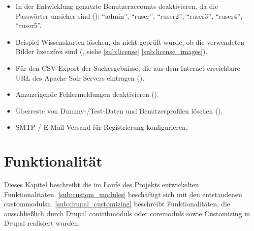 \begin{itemize}
	\item In der Entwicklung genutzte Benutzeraccounts deaktivieren, da die Passwörter unsicher sind (): \enquote{admin}, \enquote{ruser}, \enquote{ruser2}, \enquote{ruser3}, \enquote{ruser4}, \enquote{ruser5}.

	\item Beispiel-Wissenskarten löschen, da nicht geprüft wurde, ob die verwendeten Bilder lizenzfrei sind (, siehe \cref*{sub:license} \cref{sub:license_images}).

	\item Für den CSV-Export der Suchergebnisse, die aus dem Internet erreichbare URL des Apache Solr Servers eintragen ().

	\item Anzuzeigende Fehlermeldungen deaktivieren ().

	\item Überreste von Dummy-/Test-Daten und Benutzerprofilen löschen ().

	\item SMTP / E-Mail-Versand für Registrierung konfigurieren.

\end{itemize}



\newpage
\section{Funktionalität}\label{sec:function}
Dieses Kapitel beschreibt die im Laufe des Projekts entwickelten Funktionalitäten. \cref{sub:custom_modules} beschäftigt sich mit den entstandenen \glspl{custommodul}n. \cref{sub:drupal_customizing} beschreibt Funktionalitäten, die ausschließlich durch Drupal \glspl{contribmodul} oder \glspl{coremodul} sowie Customizing in Drupal realisiert wurden.

